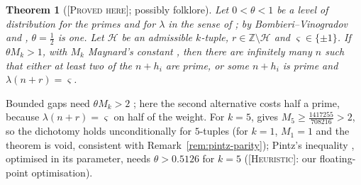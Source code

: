 \documentclass[11pt]{amsart}
\newtheorem{theorem}{Theorem}[section]
\theoremstyle{definition}
\theoremstyle{remark}
\newcommand{\lbl}[1]{\textup{\textsc{[#1]}}}
\begin{document}
\begin{theorem}[\lbl{Proved here}; possibly folklore]\label{thm:pintz-maynard}
Let $0<\theta<1$ be a level of distribution for the primes and for $\lambda$
in the sense of \cite[(2.1), (2.2)]{Pi10}; by Bombieri--Vinogradov and
\cite[Lemma~3]{Pi10}, $\theta=\frac12$ is one. Let $\mathcal H$ be an
admissible $k$-tuple, $r\in\mathbb Z\setminus\mathcal H$ and $\varsigma\in\{\pm1\}$.
If $\theta M_k>1$, with $M_k$ Maynard's constant \cite[Proposition~4.2]{May15},
then there are infinitely many $n$ such that either at least two of the
$n+h_i$ are prime, or some $n+h_i$ is prime and $\lambda(n+r)=\varsigma$.
\end{theorem}

Bounded gaps need $\theta M_k>2$ \cite[Proposition~4.2]{May15}; here the second
alternative costs half a prime, because $\lambda(n+r)=\varsigma$ on half of the
weight. For $k=5$, \cite[(8.17)]{May15} gives $M_5\ge\frac{1417255}{708216}>2$,
so the dichotomy holds unconditionally for $5$-tuples (for $k=1$, $M_1=1$
and the theorem is void, consistent with Remark~\ref{rem:pintz-parity}); Pintz's inequality
\cite[(3.22)]{Pi10}, optimised in its parameter, needs $\theta>0.5126$ for
$k=5$ (\lbl{Heuristic}: our floating-point optimisation).
\end{document}
